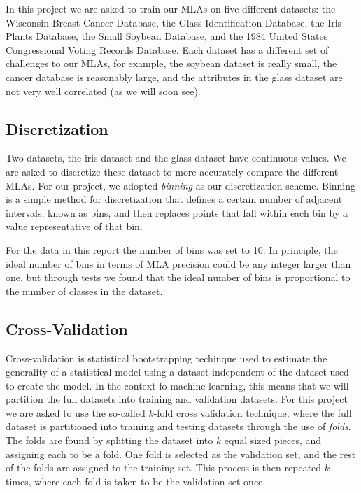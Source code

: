 \documentclass{article}
\begin{document}
	In this project we are asked to train our MLAs on five different datasets: the Wisconsin Breast Cancer Database, the Glass Identification Database, the Iris Plants Database, the Small Soybean Database, and the 1984 United States Congressional Voting Records Database. 
	Each dataset has a different set of challenges to our MLAs, for example, the soybean dataset is really small, the cancer database is reasonably large, and the attributes in the glass dataset are not very well correlated (as we will soon see).
	
	\subsection{Discretization}
	
		Two datasets, the iris dataset and the glass dataset have continuous values. 
		We are asked to discretize these dataset to more accurately compare the different MLAs.
		For our project, we adopted \textit{binning} as our discretization scheme.
		Binning is a simple method for discretization that defines a certain number of adjacent intervals, known as bins, and then replaces points that fall within each bin by a value representative of that bin.
		
		For the data in this report the number of bins was set to 10. In principle, the ideal number of bins in terms of MLA precision could be any integer larger than one, but through tests we found that the ideal number of bins is proportional to the number of classes in the dataset.
	
	\subsection{Cross-Validation}
	
		Cross-validation is statistical bootstrapping techinque used to estimate the generality of a statistical model using a dataset independent of the dataset used to create the model. 
		In the context fo machine learning, this means that we will partition the full datasets into training and validation datasets. 
		For this project we are asked to use the so-called $k$-fold cross validation technique, where the full dataset is partitioned into training and testing datasets through the use of \textit{folds}. 
		The folds are found by splitting the dataset into $k$ equal sized pieces, and assigning each to be a fold. 
		One fold is selected as the validation set, and the rest of the folds are assigned to the training set. 
		This process is then repeated $k$ times, where each fold is taken to be the validation set once.
	
\end{document}
